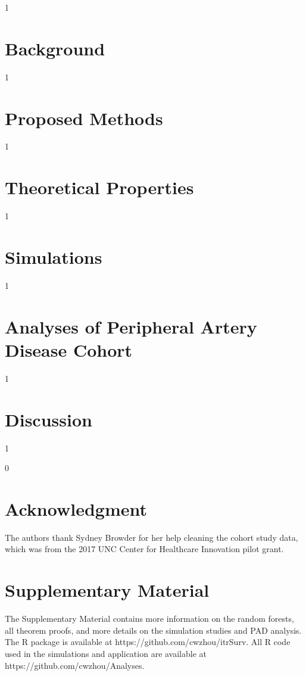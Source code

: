 \documentclass[12pt]{article}
\theoremstyle{plain} %
\newcommand{\blind}{0}
\newcommand{\sectionBACKGROUND}{1}
\newcommand{\sectionMETHODS}{1}
\newcommand{\sectionTHEORY}{1}
\newcommand{\sectionSIMS}{1}
\newcommand{\sectionRDA}{1}
\newcommand{\sectionDISC}{1}
\newcommand{\sectionOTHER}{1}
\begin{document}
\sectionBACKGROUND{
\section{Background}
\label{sec:background}

} \fi

\sectionMETHODS{
\section{Proposed Methods}
\label{sec:meth}

%
} \fi

\sectionTHEORY{
\section{Theoretical Properties}
\label{sec:theory}

} \fi

\sectionSIMS{
\section{Simulations}
    \label{sec:sims}
    
} \fi

\sectionRDA{
\section{Analyses of Peripheral Artery Disease Cohort}
    \label{sec:realdata}
    
} \fi

\sectionDISC{
\section{Discussion}
    \label{sec:disc}
    
} \fi

\sectionOTHER{
\blind{
\bigskip
\section{Acknowledgment}
The authors thank Sydney Browder for her help cleaning the cohort study data, which was from the 2017 UNC Center for Healthcare Innovation pilot grant. 
}\fi

\section{Supplementary Material}
The Supplementary Material contains more information on the random forests, all theorem proofs, and more details on the simulation studies and PAD analysis. The R package is available at https://github.com/cwzhou/itrSurv. All R code used in the simulations and application are available at https://github.com/cwzhou/Analyses.
\vspace*{-8pt}
}
\end{document}
